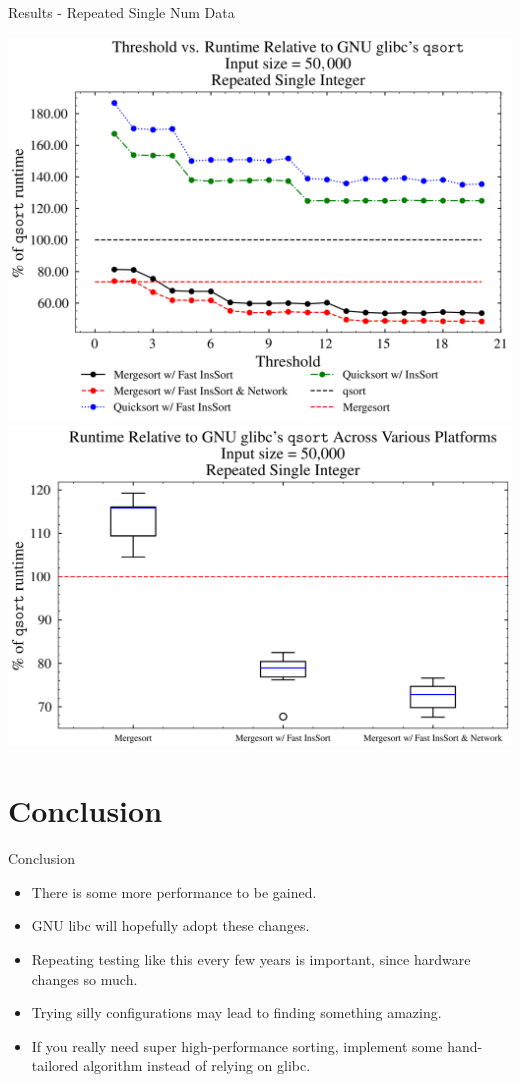 \documentclass[13pt]{beamer}
\begin{document}
\begin{frame}{Results - Repeated Single Num Data}
	\begin{multicols}{2}
		\includegraphics[width=\columnwidth]{../figures/single_num.png}
		\includegraphics[width=\columnwidth]{../figures/boxplots/1.gen.png}
	\end{multicols}
\end{frame}

\section{Conclusion}
\begin{frame}{Conclusion}
	\begin{itemize}
		\item There is some more performance to be gained.
		\item GNU libc will hopefully adopt these changes.
		\item Repeating testing like this every few years is important, since
		      hardware changes so much.
		\item Trying silly configurations may lead to finding something amazing.
		\item If you really need super high-performance sorting, implement some
		      hand-tailored algorithm instead of relying on glibc.
	\end{itemize}
\end{frame}
\end{document}
